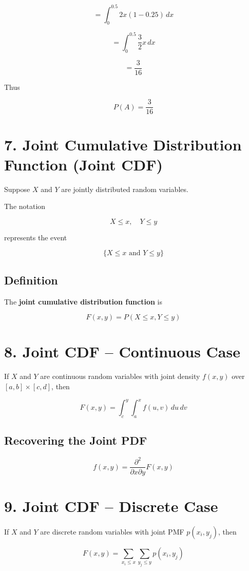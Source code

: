 \documentclass[12pt]{article}
\begin{document}
\[
= \int_0^{0.5} 2x(1 - 0.25)\,dx
\]

\[
= \int_0^{0.5} \frac{3}{2}x\,dx
\]

\[
= \frac{3}{16}
\]

Thus

\[
P(A) = \frac{3}{16}
\]

\section*{7. Joint Cumulative Distribution Function (Joint CDF)}

Suppose $X$ and $Y$ are jointly distributed random variables.

The notation

\[
X \le x,\quad Y \le y
\]

represents the event

\[
\{X \le x \text{ and } Y \le y\}
\]

\subsection*{Definition}

The \textbf{joint cumulative distribution function} is

\[
F(x,y) = P(X \le x, Y \le y)
\]

\section*{8. Joint CDF -- Continuous Case}

If $X$ and $Y$ are continuous random variables with joint density $f(x,y)$ over $[a,b]\times[c,d]$, then

\[
F(x,y) = \int_c^y \int_a^x f(u,v)\,du\,dv
\]

\subsection*{Recovering the Joint PDF}

\[
f(x,y) = \frac{\partial^2}{\partial x \partial y} F(x,y)
\]

\section*{9. Joint CDF -- Discrete Case}

If $X$ and $Y$ are discrete random variables with joint PMF $p(x_i,y_j)$, then

\[
F(x,y) = \sum_{x_i \le x} \sum_{y_j \le y} p(x_i,y_j)
\]
\end{document}
